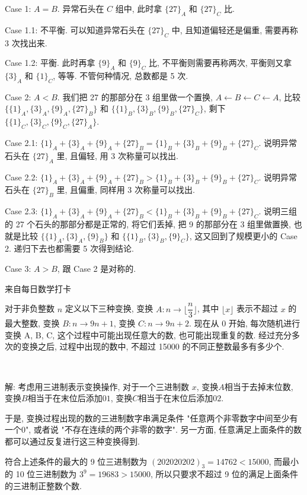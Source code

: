 Case 1: $ A = B $. 异常石头在 $ C $ 组中, 此时拿 $ \{27\}_A $ 和 $ \{27\}_C $ 比. 

Case 1.1: 不平衡. 可以知道异常石头在 $ \{27\}_C $ 中, 且知道偏轻还是偏重, 需要再称 3 次找出来.

Case 1.2: 平衡. 此时再拿 $ \{9\}_A $ 和 $ \{9\}_C $ 比, 不平衡则需要再称两次, 平衡则又拿 $ \{3\}_A $ 和 $ \{1\}_C $, 等等. 不管何种情况, 总数都是 5 次.

Case 2: $ A < B $. 我们把 27 的那部分在 3 组里做一个置换, $A\leftarrow B\leftarrow C\leftarrow A$, 比较 $ \{\{1\}_A, \{3\}_A, \{9\}_A, \{27\}_B \} $ 和 $ \{\{1\}_B, \{3\}_B, \{9\}_B, \{27\}_C \} $, 剩下 $ \{\{1\}_C, \{3\}_C, \{9\}_C, \{27\}_A \} $.

Case 2.1: $\{1\}_A + \{3\}_A + \{9\}_A + \{27\}_B = \{1\}_B + \{3\}_B + \{9\}_B + \{27\}_C $. 说明异常石头在 $\{27\}_A$ 里, 且偏轻, 用 3 次称量可以找出.

Case 2.2: $\{1\}_A + \{3\}_A + \{9\}_A + \{27\}_B > \{1\}_B + \{3\}_B + \{9\}_B + \{27\}_C $. 说明异常石头在 $\{27\}_B$ 里, 且偏重, 同样用 3 次称量可以找出.

Case 2.3: $\{1\}_A + \{3\}_A + \{9\}_A + \{27\}_B < \{1\}_B + \{3\}_B + \{9\}_B + \{27\}_C $. 说明三组的 27 个石头的那部分都是正常的, 将它们丢掉, 把 9 的那部分在 3 组里做置换, 也就是比较 $ \{\{1\}_A, \{3\}_A, \{9\}_B \} $ 和 $ \{\{1\}_B, \{3\}_B, \{9\}_C \} $, 这又回到了规模更小的 Case 2. 递归下去也都需要 5 次得到结论.

Case 3: $ A > B $, 跟 Case 2 是对称的.


\newpage
\noindent 来自每日数学打卡

对于非负整数 $n$ 定义以下三种变换, 变换 $ A: n \rightarrow \lfloor\dfrac{n}{3}\rfloor$, 其中 $\lfloor x\rfloor$ 表示不超过 $x$ 的最大整数, 变换 $B: n \rightarrow 9n+1$, 变换 $C: n \rightarrow 9n+2$. 现在从 $0$ 开始, 每次随机进行变换 A, B, C, 这个过程中可能出现任意大的数, 也可能出现重复的数. 经过充分多次的变换之后, 过程中出现的数中, 不超过 15000 的不同正整数最多有多少个.

~

解: 考虑用三进制表示变换操作, 对于一个三进制数 $x$, 变换$A$相当于去掉末位数, 变换$B$相当于在末位后添加$01$, 变换$C$相当于在末位后添加$02$.

于是, 变换过程出现的数的三进制数字串满足条件 "任意两个非零数字中间至少有一个0", 或者说 "不存在连续的两个非零的数字". 另一方面, 任意满足上面条件的数都可以通过反复进行这三种变换得到. 

符合上述条件的最大的 9 位三进制数为 $(202020202)_3 = 14762 < 15000 $, 而最小的 10 位三进制数为 $3^9=
19683 > 15000$, 所以只要求不超过 9 位的满足上面条件的三进制正整数个数.

